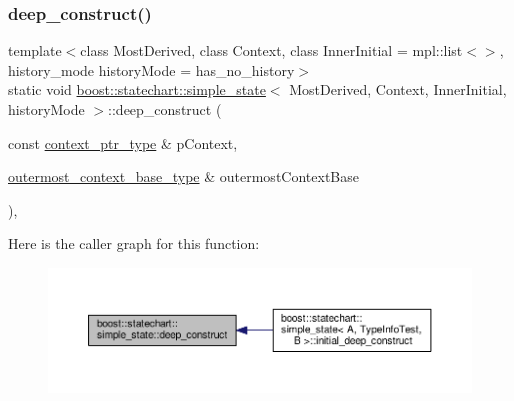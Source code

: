 \subsubsection{\texorpdfstring{deep\+\_\+construct()}{deep\_construct()}}
{\footnotesize\ttfamily template$<$class Most\+Derived, class Context, class Inner\+Initial = mpl\+::list$<$$>$, history\+\_\+mode history\+Mode = has\+\_\+no\+\_\+history$>$ \\
static void \mbox{\hyperlink{classboost_1_1statechart_1_1simple__state}{boost\+::statechart\+::simple\+\_\+state}}$<$ Most\+Derived, Context, Inner\+Initial, history\+Mode $>$\+::deep\+\_\+construct (\begin{DoxyParamCaption}\item[{const \mbox{\hyperlink{classboost_1_1statechart_1_1simple__state_ac7e361322d53b3f57976ff23056b59e7}{context\+\_\+ptr\+\_\+type}} \&}]{p\+Context,  }\item[{\mbox{\hyperlink{classboost_1_1statechart_1_1simple__state_a50f21d7a7d6632eb34430e74cbad3197}{outermost\+\_\+context\+\_\+base\+\_\+type}} \&}]{outermost\+Context\+Base }\end{DoxyParamCaption})\hspace{0.3cm}{\ttfamily [inline]}, {\ttfamily [static]}}

Here is the caller graph for this function\+:
\nopagebreak
\begin{figure}[H]
\begin{center}
\leavevmode
\includegraphics[width=350pt]{classboost_1_1statechart_1_1simple__state_a0676228f11200b54ab55883626eac8cd_icgraph}
\end{center}
\end{figure}
\mbox{\label{classboost_1_1statechart_1_1simple__state_afd4eafb6cad34c3618530d763f308f4c}} 
